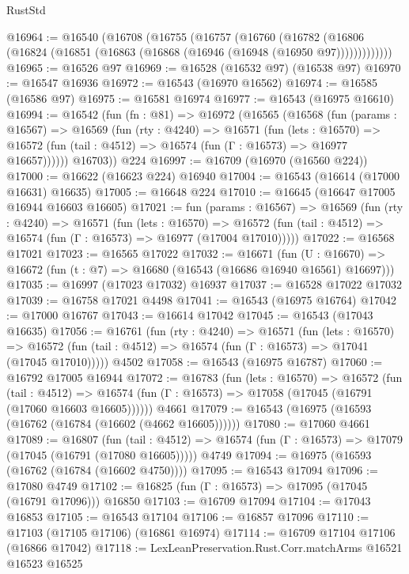 \begin{lexlean}{RustStd}
\begin{coremodule}
@16964 := @16540
    (@16708
      (@16755
        (@16757
          (@16760
            (@16782 (@16806 (@16824 (@16851 (@16863 (@16868 (@16946 (@16948 (@16950 @97)))))))))))))
@16965 := @16526 @97
@16969 := @16528 (@16532 @97) (@16538 @97)
@16970 := @16547 @16936
@16972 := @16543 (@16970 @16562)
@16974 := @16585 (@16586 @97)
@16975 := @16581 @16974
@16977 := @16543 (@16975 @16610)
@16994 := @16542
    (fun (fn : @81) =>
    @16972
      (@16565
        (@16568
          (fun (params : @16567) =>
          @16569
            (fun (rty : @4240) =>
            @16571
              (fun (lets : @16570) =>
              @16572 (fun (tail : @4512) => @16574 (fun (Γ : @16573) => @16977 @16657))))))
        @16703))
    @224
@16997 := @16709 (@16970 (@16560 @224))
@17000 := @16622 (@16623 @224) @16940
@17004 := @16543 (@16614 (@17000 @16631) @16635)
@17005 := @16648 @224
@17010 := @16645 (@16647 @17005 @16944 @16603 @16605)
@17021 := fun (params : @16567) =>
  @16569
    (fun (rty : @4240) =>
    @16571
      (fun (lets : @16570) =>
      @16572 (fun (tail : @4512) => @16574 (fun (Γ : @16573) => @16977 (@17004 @17010)))))
@17022 := @16568 @17021
@17023 := @16565 @17022
@17032 := @16671
    (fun (U : @16670) => @16672 (fun (t : @7) => @16680 (@16543 (@16686 @16940 @16561) @16697)))
@17035 := @16997 (@17023 @17032) @16937
@17037 := @16528 @17022 @17032
@17039 := @16758 @17021 @4498
@17041 := @16543 (@16975 @16764)
@17042 := @17000 @16767
@17043 := @16614 @17042
@17045 := @16543 (@17043 @16635)
@17056 := @16761
    (fun (rty : @4240) =>
    @16571
      (fun (lets : @16570) =>
      @16572 (fun (tail : @4512) => @16574 (fun (Γ : @16573) => @17041 (@17045 @17010)))))
    @4502
@17058 := @16543 (@16975 @16787)
@17060 := @16792 @17005 @16944
@17072 := @16783
    (fun (lets : @16570) =>
    @16572
      (fun (tail : @4512) =>
      @16574 (fun (Γ : @16573) => @17058 (@17045 (@16791 (@17060 @16603 @16605))))))
    @4661
@17079 := @16543 (@16975 (@16593 (@16762 (@16784 (@16602 (@4662 @16605))))))
@17080 := @17060 @4661
@17089 := @16807
    (fun (tail : @4512) => @16574 (fun (Γ : @16573) => @17079 (@17045 (@16791 (@17080 @16605)))))
    @4749
@17094 := @16975 (@16593 (@16762 (@16784 (@16602 @4750))))
@17095 := @16543 @17094
@17096 := @17080 @4749
@17102 := @16825 (fun (Γ : @16573) => @17095 (@17045 (@16791 @17096))) @16850
@17103 := @16709 @17094
@17104 := @17043 @16853
@17105 := @16543 @17104
@17106 := @16857 @17096
@17110 := @17103 (@17105 @17106) (@16861 @16974)
@17114 := @16709 @17104 @17106 (@16866 @17042)
@17118 := LexLeanPreservation.Rust.Corr.matchArms @16521 @16523 @16525

\end{coremodule}
\end{lexlean}
